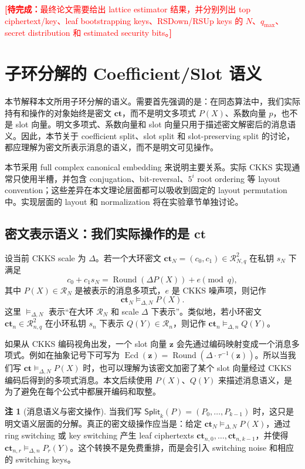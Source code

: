 \documentclass[UTF8,11pt]{article}
\newcommand{\todo}[1]{\textcolor{red}{\textbf{[待完成：}#1\textbf{]}}}
\newcommand{\Split}{\mathsf{Split}}
\newcommand{\ct}{\mathbf{ct}}
\newcommand{\Round}{\operatorname{Round}}
\theoremstyle{definition}
\newtheorem{remark}{注}
\theoremstyle{plain}
\begin{document}
\todo{最终论文需要给出 lattice estimator 结果，并分别列出 top ciphertext/key、leaf bootstrapping keys、RSDown/RSUp keys 的 \(N\)、\(q_{\max}\)、secret distribution 和 estimated security bits。}

\section{子环分解的 Coefficient/Slot 语义}
\label{sec:coeff-slot-semantics}

本节解释本文所用子环分解的语义。需要首先强调的是：在同态算法中，我们实际持有和操作的对象始终是密文 \(\ct\)，而不是明文多项式 \(P(X)\)、系数向量 \(p\)，也不是 slot 向量。明文多项式、系数向量和 slot 向量只用于描述密文解密后的消息语义。因此，本节关于 coefficient split、slot split 和 slot-preserving split 的讨论，都应理解为密文所表示消息的语义，而不是明文可见操作。

本节采用 full complex canonical embedding 来说明主要关系。实际 CKKS 实现通常只使用半槽，并包含 conjugation、bit-reversal、\(5^i\) root ordering 等 layout convention；这些差异在本文理论层面都可以吸收到固定的 layout permutation 中。实现层面的 layout 和 normalization 将在实验章节单独讨论。

\subsection{密文表示语义：我们实际操作的是 \(\ct\)}
\label{subsec:ciphertext-representation-semantics}

设当前 CKKS scale 为 \(\Delta\)。若一个大环密文 \(\ct_N=(c_0,c_1)\in\mathcal R_{N,q}^2\) 在私钥 \(s_N\) 下满足
\[
c_0+c_1s_N=\Round(\Delta P(X))+e \pmod q,
\]
其中 \(P(X)\in\mathcal R_N\) 是被表示的消息多项式，\(e\) 是 CKKS 噪声项，则记作
\[
\ct_N\vDash_{\Delta,N} P(X).
\]
这里 \(\vDash_{\Delta,N}\) 表示“在大环 \(\mathcal R_N\) 和 scale \(\Delta\) 下表示”。类似地，若小环密文 \(\ct_n\in\mathcal R_{n,q}^2\) 在小环私钥 \(s_n\) 下表示 \(Q(Y)\in\mathcal R_n\)，则记作 \(\ct_n\vDash_{\Delta,n}Q(Y)\)。

如果从 CKKS 编码视角出发，一个 slot 向量 \(\mathbf z\) 会先通过编码映射变成一个消息多项式。例如在抽象记号下可写为 \(\operatorname{Ecd}(\mathbf z)=\Round(\Delta\cdot\tau^{-1}(\mathbf z))\)。所以当我们写 \(\ct\vDash_{\Delta,N}P(X)\) 时，也可以理解为该密文加密了某个 slot 向量经过 CKKS 编码后得到的多项式消息。本文后续使用 \(P(X)\)、\(Q(Y)\) 来描述消息语义，是为了避免在每个公式中都展开编码和取整。

\begin{remark}[消息语义与密文操作]
当我们写 \(\Split_k(P)=(P_0,\ldots,P_{k-1})\) 时，这只是明文语义层面的分解。真正的密文级操作应当是：给定 \(\ct_N\vDash_{\Delta,N}P(X)\)，通过 ring switching 或 key switching 产生 leaf ciphertexts \(\ct_{n,0},\ldots,\ct_{n,k-1}\)，并使得 \(\ct_{n,r}\vDash_{\Delta,n}P_r(Y)\)。这个转换不是免费重排，而是会引入 switching noise 和相应的 switching keys。
\end{remark}
\end{document}
